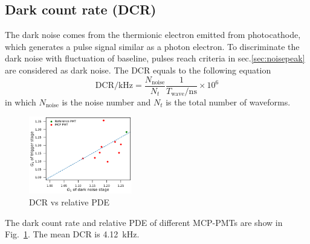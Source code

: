 \subsection{Dark count rate (DCR)}
The dark noise comes from the thermionic electron emitted from photocathode, which generates a pulse signal similar as a photon electron. To discriminate the dark noise with fluctuation of baseline, pulses reach criteria in sec.\ref{sec:noisepeak} are considered as dark noise. The DCR equals to the following equation
\begin{equation}
    \mathrm{DCR/kHz} = \frac{N_{\mathrm{noise}}}{N_{t}}\frac{1}{T_{\mathrm{wave}}/\mathrm{ns}}\times 10^{6}
\end{equation}
in which $N_{\mathrm{noise}}$ is the noise number and $N_{t}$ is the total number of waveforms.

\begin{figure}[!htbp]
    \centering
    \includegraphics[width=0.4\textwidth,page=8]{figures/result/compare.pdf}
    \caption{DCR vs relative PDE}
    \label{fig:DCRCompare}
\end{figure}
The dark count rate and relative PDE of different MCP-PMTs are show in Fig.~\ref{fig:DCRCompare}. The mean DCR is \SI{4.12}{kHz}.
